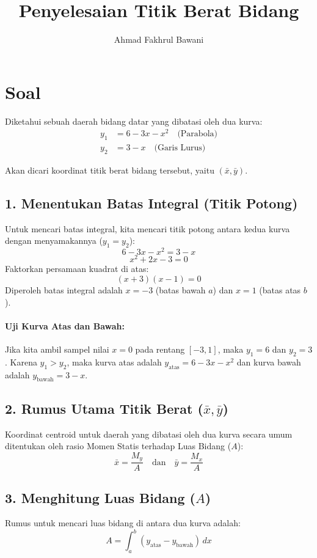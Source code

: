 \documentclass[12pt,a4paper]{article}
\title{Penyelesaian Titik Berat Bidang}
\author{Ahmad Fakhrul Bawani}
\date{}
\begin{document}
\maketitle

\section*{Soal}
Diketahui sebuah daerah bidang datar yang dibatasi oleh dua kurva:
\begin{align*}
  y_1 &= 6 - 3x - x^2 \quad \text{(Parabola)} \\
  y_2 &= 3 - x \quad \text{(Garis Lurus)}
\end{align*}

Akan dicari koordinat titik berat bidang tersebut, yaitu $(\bar{x}, \bar{y})$.

\subsection*{1. Menentukan Batas Integral (Titik Potong)}
Untuk mencari batas integral, kita mencari titik potong antara kedua kurva dengan menyamakannya ($y_1 = y_2$):
\[
  6 - 3x - x^2 = 3 - x
\]
\[
  x^2 + 2x - 3 = 0
\]
Faktorkan persamaan kuadrat di atas:
\[
  (x + 3)(x - 1) = 0
\]
Diperoleh batas integral adalah $x = -3$ (batas bawah $a$) dan $x = 1$ (batas atas $b$).

\paragraph{Uji Kurva Atas dan Bawah:}
Jika kita ambil sampel nilai $x = 0$ pada rentang $[-3, 1]$, maka $y_1 = 6$ dan $y_2 = 3$. Karena $y_1 > y_2$, maka kurva atas adalah $y_{\text{atas}} = 6 - 3x - x^2$ dan kurva bawah adalah $y_{\text{bawah}} = 3 - x$.

\subsection*{2. Rumus Utama Titik Berat ($\bar{x}, \bar{y}$)}
Koordinat centroid untuk daerah yang dibatasi oleh dua kurva secara umum ditentukan oleh rasio Momen Statis terhadap Luas Bidang ($A$):
\[
  \bar{x} = \frac{M_y}{A} \quad \text{dan} \quad \bar{y} = \frac{M_x}{A}
\]

\subsection*{3. Menghitung Luas Bidang ($A$)}
Rumus untuk mencari luas bidang di antara dua kurva adalah:
\[
  A = \int_{a}^{b} (y_{\text{atas}} - y_{\text{bawah}}) \, dx
\]
\end{document}
